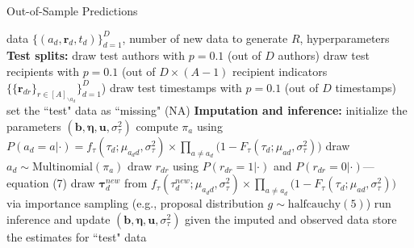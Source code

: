 \documentclass[ba]{imsart}
\def\spacingset#1{\renewcommand{\baselinestretch}%
	{#1}\small\normalsize} \spacingset{1}
\numberwithin{equation}{section}
\theoremstyle{plain}
\begin{document}
	\begin{algorithm}[!t]
		\spacingset{1}
		\caption{Out-of-Sample Predictions}
		\label{alg:PPE}
		\begin{algorithmic}
			 data $ \{ (a_d, \boldsymbol{r}_d, t_d)\}_{d=1}^D$, 
			number of new data to generate $R$,
			hyperparameters
			\vskip 0.1in
			\textbf{Test splits:}	
			\STATE draw test authors with $p=0.1$ (out of $D$ authors) 
			\STATE draw test recipients
			with $p=0.1$ (out of $D\times (A-1)$ recipient indicators $\{\{\boldsymbol{r}_{dr}\}_{r\in [A]_{\backslash a_d}}\}_{d=1}^D$)
			\STATE draw test timestamps with $p=0.1$  (out of $D$ timestamps) 
			\STATE set the ``test" data as ``missing" (NA)
			\vskip 0.1in
			\textbf{Imputation and inference:}	
			\STATE initialize the parameters $(\boldsymbol{b}, \boldsymbol{\eta}, \boldsymbol{u}, \sigma^2_\tau)$
			\STATE compute $\pi_{a} $ using $P(a_d= a | \cdot)=f_{\tau}(\tau_{d}; \mu_{a_dd}, \sigma_\tau^2)\times \prod_{a\neq a_d}\big(1-F_{\tau}(\tau_{d}; \mu_{a d}, \sigma_\tau^2) \big)$
			\ENDFOR
			\STATE draw $a_d \sim \mbox{Multinomial}(\pi_a)$
			\ENDIF
			\STATE draw $r_{dr}$ using $P(r_{dr}= 1 | \cdot)$ and $P(r_{dr}= 0| \cdot)$---equation (7)
			\ENDIF
			\ENDFOR
			\STATE draw $\boldsymbol{\tau}^{new}_d$ from $f_{\tau}(\tau^{new}_{d}; \mu_{a_d d}, \sigma_\tau^2)\times \prod_{a\neq a_d}\big(1-F_{\tau}(\tau_{d}; \mu_{a d}, \sigma_\tau^2) \big)$ via importance sampling (e.g., proposal distribution $g \sim \mbox{halfcauchy}(5)$)
			\ENDIF
			\STATE run inference and update $(\boldsymbol{b}, \boldsymbol{\eta},\boldsymbol{u}, \sigma^2_\tau)$ given the imputed and observed data
			\ENDFOR
			\STATE store the estimates for ``test" data
			\ENDFOR
		\end{algorithmic}
	\end{algorithm}
	
\end{document}
